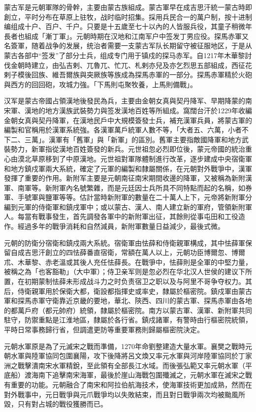 蒙古军是元朝軍隊的骨幹，主要由蒙古族組成。蒙古軍早在成吉思汗統一蒙古時即創立，平时分布在草原上驻牧，战时临时招集。採用兵民合一的萬户制，按十进制编组成十户、百户、千户。只要是十五歲至七十以內的人皆服兵役，其童子稍微年長者也組成「漸丁軍」。元朝時期在汉地和江南军户中签发丁男应役。探馬赤軍又名簽軍，随着战争的发展，统治者需要一支蒙古军队长期留守被征服地区，于是从蒙古各部中“签发”了部分士兵，组成专门用于镇戍的探马赤军。自1217年木華黎討伐金朝時建立，由弘吉剌、兀魯兀、忙兀、札剌亦兒及亦乞烈思五部組成，西征花剌子模後回族、維吾爾族與突厥族等族成為探馬赤軍的一部分。探馬赤軍精於火砲與西方的回回砲，攻城力強。「下馬則屯聚牧養，上馬則備戰」。

汉军是蒙古帝國占領漢地後發民為兵，主要由金朝女真與契丹降军、早期降蒙的南宋軍、漢地的地方漢族武裝勢力與签发漢地百姓等所組成。窩闊台汗於1229年收編金朝女真與契丹降軍，在漢地民戶中大規模簽發士兵，補充漢軍兵員，將蒙古軍的編製和官稱用於漢軍系統強。各漢軍萬戶統軍人數不等，「大者五、六萬，小者不下二、三萬」。漢軍有「舊軍」與「新軍」的區別。舊軍主要指敵國降軍和地方武裝勢力，新軍指從漢地百姓簽發的新兵。元世祖忽必烈即位後，蒙元帝國的統治重心由漠北草原移到了中原漢地。元世祖對軍隊體制進行改革，逐步建成中央宿衛軍和地方鎮戍軍兩大系統，確定了元軍的編製和隸屬關係，在元朝對外戰爭中，漢軍發揮了重要的作用。新附军主要是元朝南征南宋期間收邊的降軍，又被稱為新附漢軍、南軍等。新附軍內名號繁雜，而是元廷因士兵所具不同特點而起的名稱，如券軍、手號軍與鹽軍等等。估計當時新附軍的數量在二十萬人上下，元帝將新附軍分編到元軍的侍衛軍和鎮戌軍中；或以蒙古、漢人、南人建立新的軍府，管領新附軍人。每當有戰事發生，首先調發各軍中的新附軍出征，其餘則從事屯田和工役造作。經過多年的戰爭消耗和自然減員，新附軍數量日益減少，最後式微。

元朝的防衛分宿衛和鎮戍兩大系統。宿衛軍由怯薛和侍衛親軍構成，其中怯薛軍保留自成吉思汗創立的四怯薛番直宿衛，常額在萬人以上，元朝功臣博爾忽、博爾朮、木華黎、赤老溫或其後人充任怯薛長。在戰爭中，怯薛則是全軍的中堅力量，被稱之為「也客豁勒」（大中軍）；侍卫亲军则是忽必烈在华北汉人世侯的建议下所置，在初期蒙制怯薛未形成战斗力之时负责宿卫之职以及与阿里不哥争夺权力。其后，侍衛親軍用於保衛大都，衛設都指揮史或率史，隸屬於樞密院。鎮戍軍由蒙古軍和探馬赤軍守衛靠近京畿的要地，華北、陝西、四川的蒙古軍、探馬赤軍由各地的都萬戶府（都元帥府）統領，隸屬於樞密院。南方以蒙古軍、漢軍、新附軍共同駐守，防禦重點是江淮地區，隸屬於各行省。鎮戍諸軍，有警時由行樞密院統領，平時日常事務歸行省，但調遣更防等重要軍務則歸屬樞密院決定。

元朝水軍原是為了元滅宋之戰而準備，1270年命劉整建造大量水軍。襄樊之戰時元朝水軍與陸軍協同包圍襄陽，攻下後降將呂文煥又率元水軍與河岸陸軍協同於丁家洲之戰擊潰南宋水軍精銳，至此領有全部長江水域。而後張弘範又率元朝水軍（平底船）渡海南下追擊南宋海軍，最後於崖山海戰包圍殲滅之，元朝水軍在滅宋之戰有重要的功能。元朝融合了南宋和阿拉伯航海技术，使海軍技術更加成熟，然而在對外戰事中，元日戰爭與元爪戰爭均以失敗結束，而且對日戰爭兩次均被颱風所毀，只有對占城的戰役獲勝而已。

